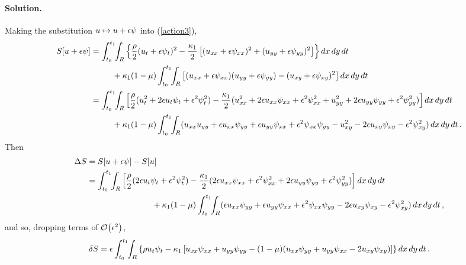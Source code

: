 \documentclass[11pt]{article}
\newcommand{\refeq}[1]{(\ref{#1})}
\newcommand{\beqn}{\begin{equation}}
\newcommand{\eeqn}{\end{equation}}
\newenvironment{solution}
{
    \paragraph{Solution.}
    \ignorespaces
}
{
}
\begin{document}
\begin{solution}
	Making the substitution $u \mapsto u + \epsilon \psi$ into \refeq{action3},
	\begin{align*}
		S[u + \eps \psi] &= \inttr \left\{ \frac{\rho}{2} (\ut + \eps \psit)^2 - \frac{\kaq}{2} \left[ (\uxx + \eps \psixx)^2 + (\uyy + \eps \psiyy)^2 \right] \right\} \drt \\
		&\phantom{mmm} + \kaq (1 - \mu) \inttr \left[ (\uxx + \eps \psixx) (\uyy + \eps \psiyy) - (\uxy + \eps \psixy)^2 \right] \drt \\
		&= \inttr \left[ \frac{\rho}{2} (\ut^2 + 2 \eps \ut \psit + \eps^2 \psit^2) - \frac{\kaq}{2} (\uxx^2 + 2 \eps \uxx \psixx + \eps^2 \psixx^2 + \uyy^2 + 2 \eps \uyy \psiyy + \eps^2 \psiyy^2) \right] \drt \\
		&\phantom{mmm} + \kaq (1 - \mu) \inttr (\uxx \uyy + \eps \uxx \psiyy + \eps \uyy \psixx + \eps^2 \psixx \psiyy - \uxy^2 - 2 \eps \uxy \psixy - \eps^2 \psixy^2 ) \drt.
	\end{align*}
	Then
	\begin{align*}
		\Delta S &= S[u + \epsilon \psi] - S[u] \\
		&=  \int_{t_0}^{t_1} \!\!\int_R \left[ \frac{\rho}{2} (2 \epsilon u_t \psi_t + \epsilon^2 \psi_t^2) - \frac{\kappa_1}{2} (2 \epsilon u_{xx} \psi_{xx} + \epsilon^2 \psi_{xx}^2 + 2 \epsilon u_{yy} \psi_{yy} + \epsilon^2 \psi_{yy}^2) \right] \dd{x} \dd{y} \dd{t} \\
		&\phantom{mmmmmmmmm} + \kappa_1 (1 - \mu) \int_{t_0}^{t_1} \!\!\int_R (\epsilon u_{xx} \psi_{yy} + \epsilon u_{yy} \psi_{xx} + \epsilon^2 \psi_{xx} \psi_{yy} - 2 \epsilon u_{xy} \psi_{xy} - \epsilon^2 \psi_{xy}^2 ) \dd{x} \dd{y} \dd{t},
	\end{align*}
	and so, dropping terms of $\order{\eps^2}$,
	\beqn \label{dS1}
		\dS = \eps \inttr \left\{ \rho \ut \psit - \kaq \left[ \uxx \psixx + \uyy \psiyy - (1 - \mu) (\uxx \psiyy + \uyy \psixx - 2 \uxy \psixy) \right] \right\} \drt.
	\eeqn
	

\end{solution}
\end{document}
